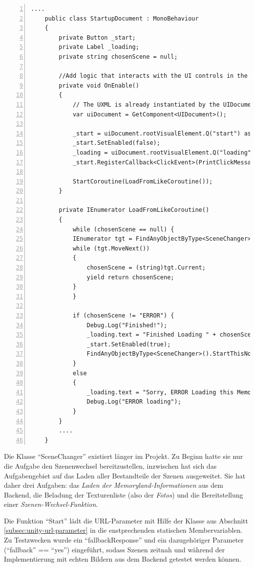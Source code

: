 \begin{lstlisting}[numbers=left,caption={StartupDocument für Unity UI Toolkit},label={lst:unity-startup-document}]
....    
    public class StartupDocument : MonoBehaviour
    {
        private Button _start;
        private Label _loading;
        private string chosenScene = null;
           
        //Add logic that interacts with the UI controls in the `OnEnable` methods
        private void OnEnable()
        {
            // The UXML is already instantiated by the UIDocument component
            var uiDocument = GetComponent<UIDocument>();
    
            _start = uiDocument.rootVisualElement.Q("start") as Button;
            _start.SetEnabled(false);
            _loading = uiDocument.rootVisualElement.Q("loading") as Label;
            _start.RegisterCallback<ClickEvent>(PrintClickMessage);
            
            StartCoroutine(LoadFromLikeCoroutine());
        }
    
        private IEnumerator LoadFromLikeCoroutine()
        {
            while (chosenScene == null) {
            IEnumerator tgt = FindAnyObjectByType<SceneChanger>().IsValid();
            while (tgt.MoveNext()) 
            {
                chosenScene = (string)tgt.Current;
                yield return chosenScene;
            }
            }
            
            if (chosenScene != "ERROR") {
                Debug.Log("Finished!");
                _loading.text = "Finished Loading " + chosenScene;
                _start.SetEnabled(true);
                FindAnyObjectByType<SceneChanger>().StartThisNow();
            }
            else 
            {
                _loading.text = "Sorry, ERROR Loading this Memoryland. Possibly Token invalid!";
                Debug.Log("ERROR loading");
            }
        }
        ....
    }        
\end{lstlisting}


Die Klasse ``SceneChanger'' existiert länger im Projekt. Zu Beginn hatte sie nur die Aufgabe den Szenenwechsel bereitzustellen, inzwischen hat sich das Aufgabengebiet auf das Laden aller Bestandteile der Szenen ausgeweitet. Sie hat daher drei Aufgaben: das \emph{Laden der Memoryland-Informationen} aus dem Backend, die Beladung der Texturenliste (also der \emph{Fotos}) und die Bereitstellung einer \emph{Szenen-Wechsel-Funktion}.

Die Funktion ``Start'' lädt die URL-Parameter mit Hilfe der Klasse aus Abschnitt \ref{subsec:unity-url-parameter} in die enstprechenden statischen Membervariablen. Zu Testzwecken wurde ein ``fallbackResponse'' und ein dazugehöriger Parameter (``fallback'' == ``yes'') eingeführt, sodass Szenen zeitnah und während der Implementierung mit echten Bildern aus dem Backend getestet werden können.


